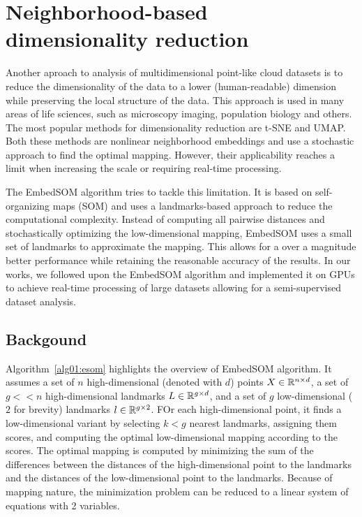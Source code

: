\section{Neighborhood-based dimensionality reduction}

Another aproach to analysis of multidimensional point-like cloud datasets is to reduce the dimensionality of the data to a lower (human-readable) dimension while preserving the local structure of the data. This approach is used in many areas of life sciences, such as microscopy imaging, population biology and others. The most popular methods for dimensionality reduction are t-SNE and UMAP. Both these methods are nonlinear neighborhood embeddings and use a stochastic approach to find the optimal mapping. However, their applicability reaches a limit when increasing the scale or requiring real-time processing.

The EmbedSOM algorithm tries to tackle this limitation. It is based on self-organizing maps (SOM) and uses a landmarks-based approach to reduce the computational complexity. Instead of computing all pairwise distances and stochastically optimizing the low-dimensional mapping, EmbedSOM uses a small set of landmarks to approximate the mapping. This allows for a over a magnitude better performance while retaining the reasonable accuracy of the results. In our works, we followed upon the EmbedSOM algorithm and implemented it on GPUs to achieve real-time processing of large datasets allowing for a semi-supervised dataset analysis.

\subsection{Backgound}

Algorithm~\ref{alg01:esom} highlights the overview of EmbedSOM algorithm. It assumes a set of $n$ high-dimensional (denoted with $d$) points $X \in \mathbb{R}^{n \times d}$, a set of $g << n$ high-dimensional landmarks $L \in \mathbb{R}^{g \times d}$, and a set of $g$ low-dimensional ($2$ for brevity) landmarks $l \in \mathbb{R}^{g \times 2}$. FOr each high-dimensional point, it finds a low-dimensional variant by selecting $k < g$ nearest landmarks, assigning them scores, and computing the optimal low-dimensional mapping according to the scores. The optimal mapping is computed by minimizing the sum of the differences between the distances of the high-dimensional point to the landmarks and the distances of the low-dimensional point to the landmarks. Because of mapping nature, the minimization problem can be reduced to a linear system of equations with 2 variables.

